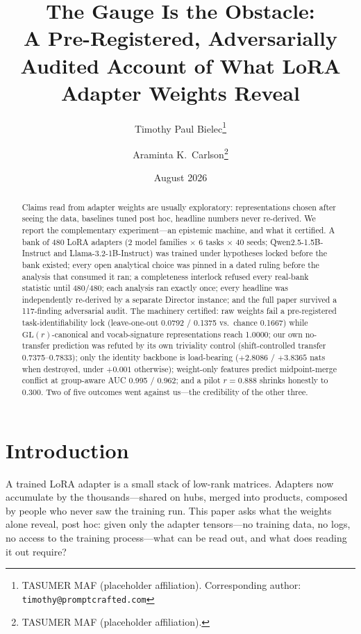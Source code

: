 \documentclass[10pt]{article}
\title{%
  The Gauge Is the Obstacle:\\
  \large A Pre-Registered, Adversarially Audited Account of What LoRA
  Adapter Weights Reveal%
}
\author{%
  Timothy Paul Bielec\thanks{TASUMER MAF (placeholder affiliation).
  Corresponding author: \texttt{timothy@promptcrafted.com}}
  \and
  Araminta K.\ Carlson\thanks{TASUMER MAF (placeholder affiliation).}%
}
\date{August 2026}
\begin{document}
\maketitle

\begin{abstract}
Claims read from adapter weights are usually exploratory: representations
chosen after seeing the data, baselines tuned post hoc, headline numbers
never re-derived. We report the complementary experiment---an epistemic
machine, and what it certified. A bank of 480 LoRA adapters (2 model
families $\times$ 6 tasks $\times$ 40 seeds; Qwen2.5-1.5B-Instruct and
Llama-3.2-1B-Instruct) was trained under hypotheses locked before the bank
existed; every open analytical choice was pinned in a dated ruling before
the analysis that consumed it ran; a completeness interlock refused every
real-bank statistic until 480/480; each analysis ran exactly once; every
headline was independently re-derived by a separate Director instance; and
the full paper survived a 117-finding adversarial audit. The machinery
certified: raw weights fail a pre-registered task-identifiability lock
(leave-one-out 0.0792 / 0.1375 vs.\ chance 0.1667) while
$\mathrm{GL}(r)$-canonical and vocab-signature representations reach
1.0000; our own no-transfer prediction was refuted by its own triviality
control (shift-controlled transfer 0.7375--0.7833); only the identity
backbone is load-bearing ($+2.8086$ / $+3.8365$ nats when destroyed,
under $+0.001$ otherwise); weight-only features predict midpoint-merge
conflict at group-aware AUC 0.995 / 0.962; and a pilot $r = 0.888$ shrinks
honestly to 0.300. Two of five outcomes went against us---the credibility
of the other three.
\end{abstract}

\section{Introduction}
\label{sec:intro}

A trained LoRA adapter is a small stack of low-rank matrices. Adapters now
accumulate by the thousands---shared on hubs, merged into products, composed
by people who never saw the training run. This paper asks what the weights
alone reveal, post hoc: given only the adapter tensors---no training data,
no logs, no access to the training process---what can be read out, and what
does reading it out require?
\end{document}
